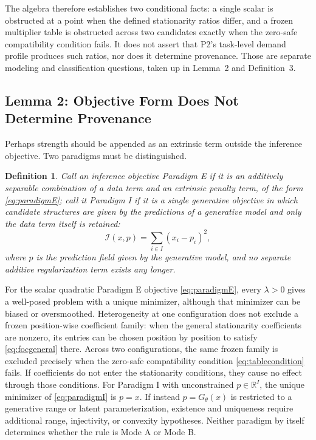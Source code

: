 \documentclass[twoside,11pt]{article}
\newtheorem{defn}{Definition}
\begin{document}
The algebra therefore establishes two conditional facts: a single scalar is obstructed at a point when the defined stationarity ratios differ, and a frozen multiplier table is obstructed across two candidates exactly when the zero-safe compatibility condition fails. It does not assert that P2's task-level demand profile produces such ratios, nor does it determine provenance. Those are separate modeling and classification questions, taken up in Lemma~2 and Definition~3.

\subsection{Lemma 2: Objective Form Does Not Determine Provenance}

Perhaps strength should be appended as an extrinsic term outside the inference objective. Two paradigms must be distinguished.

\begin{defn}
Call an inference objective \emph{Paradigm E} if it is an additively separable combination of a data term and an extrinsic penalty term, of the form \eqref{eq:paradigmE}; call it \emph{Paradigm I} if it is a single generative objective in which candidate structures are given by the predictions of a generative model and only the data term itself is retained:
\begin{equation}
\mathcal{I}(x, p) = \sum_{i \in I} (x_i - p_i)^2 ,
\label{eq:paradigmI}%
\end{equation}%
where $p$ is the prediction field given by the generative model, and no separate additive regularization term exists any longer.
\end{defn}

\begin{lemma}
For the scalar quadratic Paradigm E objective \eqref{eq:paradigmE}, every $\lambda>0$ gives a well-posed problem with a unique minimizer, although that minimizer can be biased or oversmoothed. Heterogeneity at one configuration does not exclude a frozen position-wise coefficient family: when the general stationarity coefficients are nonzero, its entries can be chosen position by position to satisfy \eqref{eq:focgeneral} there. Across two configurations, the same frozen family is excluded precisely when the zero-safe compatibility condition \eqref{eq:tablecondition} fails. If coefficients do not enter the stationarity conditions, they cause no effect through those conditions. For Paradigm I with unconstrained $p\in\mathbb{R}^{I}$, the unique minimizer of \eqref{eq:paradigmI} is $p=x$. If instead $p=G_{\theta}(x)$ is restricted to a generative range or latent parameterization, existence and uniqueness require additional range, injectivity, or convexity hypotheses. Neither paradigm by itself determines whether the rule is Mode A or Mode B.
\label{lem:objective}%
\end{lemma}
\end{document}
